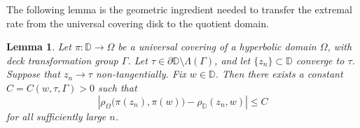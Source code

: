 \documentclass[12pt]{amsart}
\numberwithin{equation}{section}
\theoremstyle{plain}
\newtheorem{lemma}[equation]{Lemma}
\theoremstyle{definition}
\begin{document}
The following lemma is the geometric ingredient needed to transfer the
extremal rate from the universal covering disk to the quotient domain.

\begin{lemma}
\label{lem:covering_distance}
Let $\pi:\mathbb D\to\Omega$ be a universal covering of a hyperbolic
domain $\Omega$, with deck transformation group $\Gamma$. Let
$\tau\in\partial\mathbb D\setminus\Lambda(\Gamma)$, and let
$\{z_n\}\subset\mathbb D$ converge to $\tau$. Suppose that
$z_n\to\tau$ non-tangentially. Fix $w\in\mathbb D$. Then there exists a
constant $C=C(w,\tau,\Gamma)>0$ such that
\begin{equation}
\label{eq:covering_distance_comparison}
\left|
\rho_\Omega\bigl(\pi(z_n),\pi(w)\bigr)
-
\rho_{\mathbb D}(z_n,w)
\right|
\le C
\end{equation}
for all sufficiently large $n$.
\end{lemma}
\end{document}
